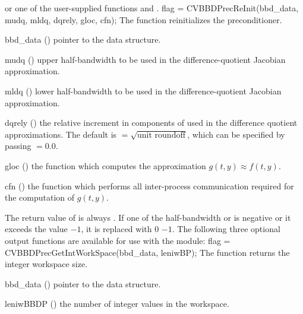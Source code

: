or one of the user-supplied functions  and .
{
  flag = CVBBDPrecReInit(bbd\_data, mudq, mldq, dqrely, gloc, cfn);
}
{
  The function  reinitializes the {\cvbbdpre} preconditioner.
}
{
  \begin{args}
  \item[bbd\_data] ()
    pointer to the {\cvbbdpre} data structure.
  \item[mudq] ()
    upper half-bandwidth to be used in the difference-quotient Jacobian approximation.
  \item[mldq] ()
    lower half-bandwidth to be used in the difference-quotient Jacobian approximation.
  \item[dqrely] ()
    the relative increment in components of  used in the difference quotient
    approximations.  The default is  $= \sqrt{\text{unit roundoff}}$, which
    can be specified by passing  $= 0.0$.
  \item[gloc] ()
    the {\C} function which computes the approximation $g(t,y) \approx f(t,y)$. 
  \item[cfn] ()
    the {\C} function which performs all inter-process communication required for
    the computation of $g(t,y)$.
  \end{args}
}
{
  The return value of  is always .
}
{
  If one of the half-bandwidth  or  is negative or it
  exceeds the value $-1$, it is replaced with 0 $-1$.
}
The following three optional output functions are available for use with
the {\cvbbdpre} module:
{
  flag = CVBBDPrecGetIntWorkSpace(bbd\_data, leniwBP);
}
{
  The function  returns the
  {\cvbbdpre} integer workspace size.
}
{
  \begin{args}[leniwBBDP]
  \item[bbd\_data] ()
    pointer to the {\cvbbdpre} data structure.
  \item[leniwBBDP] ()
    the number of integer values in the {\cvbbdpre} workspace.
  \end{args}
}
